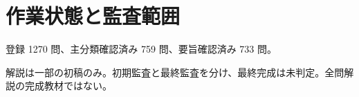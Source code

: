 \chapter{作業状態と監査範囲}
登録 1270 問、主分類確認済み 759 問、要旨確認済み 733 問。
\par 解説は一部の初稿のみ。初期監査と最終監査を分け、最終完成は未判定。全問解説の完成教材ではない。
